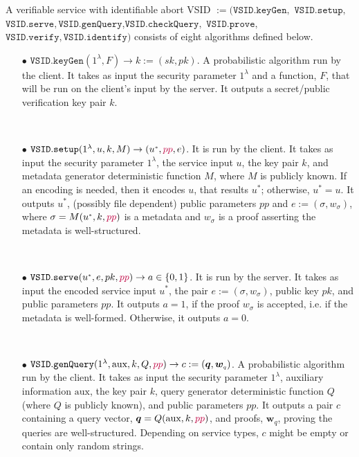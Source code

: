 \begin{definition}\label{service-def} A verifiable service with identifiable abort  VSID $:=(\mathtt{VSID.keyGen}, $ $\mathtt{VSID.setup}, $ $\mathtt{VSID.serve},\mathtt{VSID.genQuery}$,$\mathtt{VSID.checkQuery},$ $\mathtt{VSID.prove},$ $\mathtt{VSID.verify}, \mathtt{VSID.identify})$ consists of eight algorithms defined below.


\begin{itemize}
\item[$\bullet$] $\mathtt{VSID.keyGen}(1^{\lambda},F)\rightarrow k:=(sk,pk)$.  A probabilistic algorithm run by the client. It takes as input the security parameter $1^{\lambda}$ and a function, $F$, that will be run on the client's input by the server. It outputs a secret/public verification key pair $k$. %




\

\item[$\bullet$] $\mathtt{VSID.setup}(1^{\lambda}, u,k,M)\rightarrow (u^{\scriptscriptstyle *}, {\color{purple}pp},e)$. It is run by the client. It takes as input the security parameter $1^{\lambda}$,  the service  input $u$,  the key pair $k$, and metadata generator deterministic function $M$, where $M$ is publicly known. If an encoding is needed, then it encodes $u$, that results $u^{\scriptscriptstyle *}$; otherwise, $u^{\scriptscriptstyle *}=u$. It outputs  $u^{\scriptscriptstyle *}$, {\color{purple}(possibly file dependent) public parameters $pp$} and $e:=(\sigma,w_{\sigma})$, where $\sigma=M(u^{\scriptscriptstyle *},k, {\color{purple}pp})$ is a metadata and $w_{\sigma}$ is a proof asserting the metadata is well-structured.  

\

\item[$\bullet$] $\mathtt{VSID.serve}(u^{\scriptscriptstyle *},e,pk, {\color{purple}pp})\rightarrow a\in\{0,1\}$. It is run by the server. It takes as input the encoded service input $u^{\scriptscriptstyle *}$, the pair $e:=(\sigma,w_{\sigma})$, public key $pk$, and {\color{purple}public parameters $pp$}. It outputs $a=1$, if the proof $w_{\sigma}$ is accepted, i.e. if the metadata is well-formed. Otherwise, it outputs $a=0$. 

\

\item[$\bullet$] $\mathtt{VSID.genQuery}(1^{\lambda},  \text{aux}, k,Q,{\color{purple}pp})\rightarrow c:=(\bm{q},\bm{w}_{\scriptscriptstyle q})$. A probabilistic algorithm run by the client. It takes as input the security parameter $1^{\lambda}$, auxiliary information $ \text{aux}$,  the key pair $k$,    query generator deterministic function $Q$ (where $Q$ is publicly known), and {\color{purple} public parameters $pp$}. It outputs a pair $c$ containing a query vector, $\bm{q}=Q( \text{aux},k,{\color{purple}pp})$,  and proofs, $\bm{w}_{\scriptscriptstyle q}$, proving the queries are well-structured. Depending on service types, $c$ might be  empty or  contain only random strings.


\end{itemize}
\end{definition}
